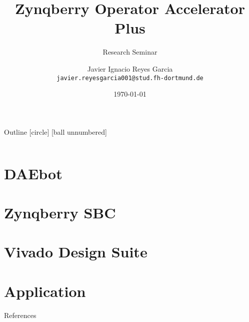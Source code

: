 \documentclass{beamer}
\title{Zynqberry Operator Accelerator Plus}
\subtitle{Research Seminar}
\author{Javier Ignacio Reyes Garcia \\
	\tiny{\texttt{javier.reyesgarcia001@stud.fh-dortmund.de}}}
\institute{Dortmund University of Applied Sciences and Arts}
\date{\today}
\begin{document}
\maketitle

\begin{frame}{Outline}
	[circle]
	[ball unnumbered]
	\begin{columns}[t]
		\begin{column}{0.5\textwidth}
				\tableofcontents[sections={1-2}]
		\end{column}
		\begin{column}{0.5\textwidth}
				\tableofcontents[sections={3-4}]
		\end{column}
	\end{columns}
\end{frame}


\section{DAEbot}


\section{Zynqberry SBC}


\section{Vivado Design Suite}


\section{Application}


\begin{frame}[allowframebreaks]{References}
	\printbibliography
	\nocite{*}
\end{frame}
\end{document}
